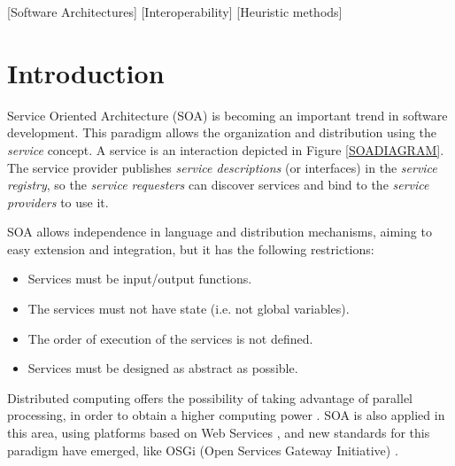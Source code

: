 \documentclass{sig-alternate}
\begin{document}
[Software Architectures]
[Interoperability]
[Heuristic methods]





%
%
\section{Introduction}
\label{sec:intro}
%

Service Oriented Architecture (SOA) \cite{PAPAZOGLOU} is becoming an important trend in software development. This paradigm allows the organization and distribution using the {\em service} concept. A service is an interaction depicted in Figure \ref{SOADIAGRAM}. The service provider publishes {\em service descriptions} (or interfaces) in the {\em service registry}, so the {\em service requesters} can discover services and bind to the {\em service providers} to use it.

SOA allows independence in language and distribution mechanisms, aiming to easy extension and integration, but it has the following restrictions:

\begin{itemize}
\item Services must be input/output functions.
\item The services must not have state (i.e. not global variables).
\item The order of execution of the services is not defined.
\item Services must be designed as abstract as possible.
\end{itemize}

Distributed computing offers the possibility of taking advantage of parallel processing,
 in order to obtain a higher 
computing power \cite{OPENSCIENCEGRID}.
 SOA is also applied in this area, using platforms based on Web Services \cite{PAPAZOGLOU}, and new standards for this paradigm have emerged, like OSGi (Open Services Gateway Initiative) \cite{OSGI}.
\end{document}
